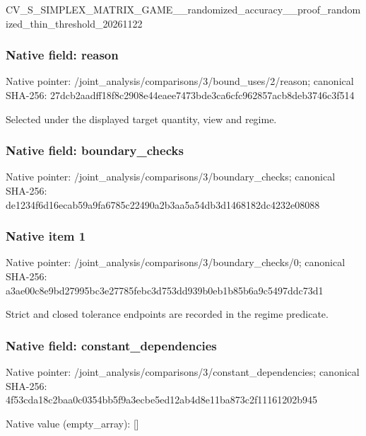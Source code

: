 \documentclass[10pt,a4paper]{article}
\begin{document}
CV\_S\_SIMPLEX\_MATRIX\_GAME\allowbreak{}\_\_randomized\_accuracy\_\_p\allowbreak{}roof\_randomized\_thin\_thr\allowbreak{}eshold\_20261122


\subsubsection{Native field: reason}


Native pointer: /joint\_analysis/comparis\allowbreak{}ons/3/bound\_uses/2/reaso\allowbreak{}n; canonical SHA-256: 27dcb2aadff18f8c2908e44e\allowbreak{}aee7473bde3ca6cfc962857a\allowbreak{}cb8deb3746c3f514


Selected under the displayed target quantity, view and regime.


\subsubsection{Native field: boundary\_checks}


Native pointer: /joint\_analysis/comparis\allowbreak{}ons/3/boundary\_checks; canonical SHA-256: de1234f6d16ecab59a9fa678\allowbreak{}5c22490a2b3aa5a54db3d146\allowbreak{}8182dc4232e08088



\subsubsection{Native item 1}


Native pointer: /joint\_analysis/comparis\allowbreak{}ons/3/boundary\_checks/0; canonical SHA-256: a3ae00c8e9bd27995bc3e277\allowbreak{}85febc3d753dd939b0eb1b85\allowbreak{}b6a9c5497ddc73d1


Strict and closed tolerance endpoints are recorded in the regime predicate.


\subsubsection{Native field: constant\_dependencies}


Native pointer: /joint\_analysis/comparis\allowbreak{}ons/3/constant\_dependenc\allowbreak{}ies; canonical SHA-256: 4f53cda18c2baa0c0354bb5f\allowbreak{}9a3ecbe5ed12ab4d8e11ba87\allowbreak{}3c2f11161202b945



Native value (empty\_array): []
\end{document}
